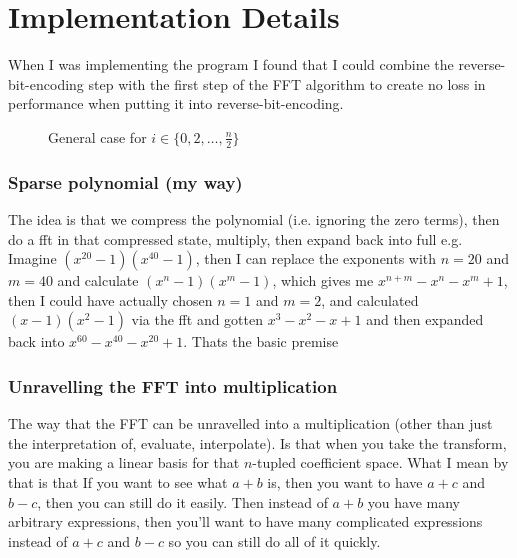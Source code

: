 
\chapter{Implementation Details}\label{impl-details}

When I was implementing the program I found that I could combine the reverse-bit-encoding step with the first step of the FFT algorithm to create no loss in performance when putting it into reverse-bit-encoding.
\begin{figure}
    \centering
    \caption{General case for $i \in \{0, 2, \ldots, \frac{n}{2}\}$}
\end{figure}

\subsection{Sparse polynomial (my way)}

The idea is that we compress the polynomial (i.e. ignoring the zero terms), then do a fft in that compressed state, multiply, then expand back into full
e.g. Imagine $(x^{20} - 1)(x^{40} - 1)$, then I can replace the exponents with $n = 20$ and $m = 40$ and calculate $(x^n - 1)(x^m -1)$, which gives me $x^{n+m} - x^n - x^m + 1$, then I could have actually chosen $n = 1$ and $m = 2$, and calculated $(x - 1)(x^2 - 1)$ via the fft and gotten $x^3 - x^2 - x + 1$ and then expanded back into $x^{60} - x^{40} - x^{20} + 1$. Thats the basic premise

\subsection{Unravelling the FFT into multiplication}

The way that the FFT can be unravelled into a multiplication (other than just the interpretation of, evaluate, interpolate). Is that when you take the transform, you are making a linear basis for that $n$-tupled coefficient space. What I mean by that is that If you want to see what $a + b$ is, then you want to have $a + c$ and $b - c$, then you can still do it easily. Then instead of $a + b$ you have many arbitrary expressions, then you'll want to have many complicated expressions instead of $a + c$ and $b - c$ so you can still do all of it quickly.


